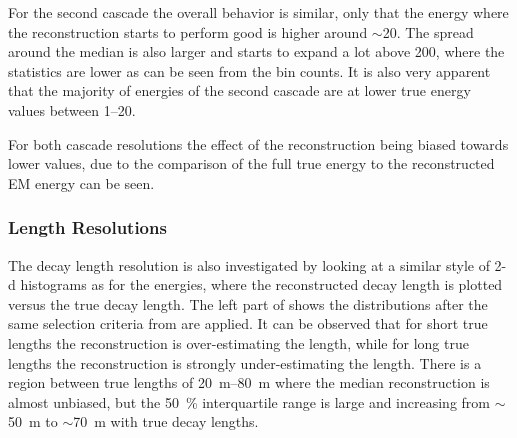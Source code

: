For the second cascade the overall behavior is similar, only that the energy where the reconstruction starts to perform good is higher around $\sim$\SI{20}{\gev}. The spread around the median is also larger and starts to expand a lot above \SI{200}{\gev}, where the statistics are lower as can be seen from the bin counts. It is also very apparent that the majority of energies of the second cascade are at lower true energy values between \SIrange[range-phrase=~and~]{1}{20}{\gev}.

For both cascade resolutions the effect of the reconstruction being biased towards lower values, due to the comparison of the full true energy to the reconstructed EM energy can be seen.


\subsubsection{Length Resolutions}

The decay length resolution is also investigated by looking at a similar style of 2-d histograms as for the energies, where the reconstructed decay length is plotted versus the true decay length. The left part of  shows the distributions after the same selection criteria from  are applied. It can be observed that for short true lengths the reconstruction is over-estimating the length, while for long true lengths the reconstruction is strongly under-estimating the length. There is a region between true lengths of \SIrange[range-phrase=~and~]{20}{80}{\meter} where the median reconstruction is almost unbiased, but the \SI{50}{\percent} interquartile range is large and increasing from $\sim$\SI{50}{\meter} to $\sim$\SI{70}{\meter} with true decay lengths.

